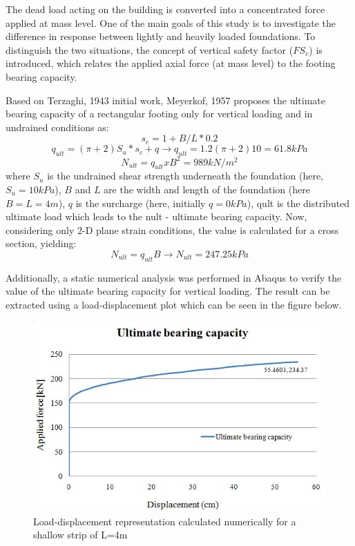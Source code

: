	The dead load acting on the building is converted into a concentrated force applied at mass level. One of the main goals of this study is to investigate the difference in response between lightly and heavily loaded foundations. To distinguish the two situations, the concept of vertical safety factor ($FS_v$) is introduced, which relates the applied axial force (at mass level) to the footing bearing capacity.
	
	Based on Terzaghi, 1943 initial work, Meyerkof, 1957\cite{meyerhof1957ultimate} proposes the ultimate bearing capacity of a rectangular footing only for vertical loading and in undrained conditions as:
	\begin{equation}
		s_c=1+B/L*0.2
	\end{equation}
	\begin{equation}
		q_{ult}=(\pi +2)S_u*s_c + q \longrightarrow q_{ult}=1.2 (\pi+2) 10= 61.8kPa
	\end{equation}
	\begin{equation}
		N_{ult}=q_{ult}xB^2=989 kN/m^2
	\end{equation}
	where $S_u$ is the undrained shear strength underneath the foundation (here, $S_u=10kPa$), $B$ and $L$ are the width and length of the foundation (here $B=L=4m$), $q$ is the surcharge (here, initially $q=0kPa$), \gls{qult} is the distributed ultimate load which leads to the \gls{nult} - ultimate bearing capacity. Now, considering only 2-D plane strain conditions, the value is calculated for a cross section, yielding:
	\begin{equation}
		N_{ult}=q_{ult} B \longrightarrow N_{ult}=247.25 kPa
	\end{equation}
	
	Additionally, a static numerical analysis was performed in Abaqus to verify the value of the ultimate bearing capacity for vertical loading. The result can be extracted using a load-displacement plot which can be seen in the figure below.


		\begin{figure}[!h]
			\centering
			\includegraphics[width=0.5\linewidth]{"ultimatebearing"}
			\caption{Load-displacement representation calculated numerically for a shallow strip of L=4m}
			\label{bearing}
		\end{figure}

